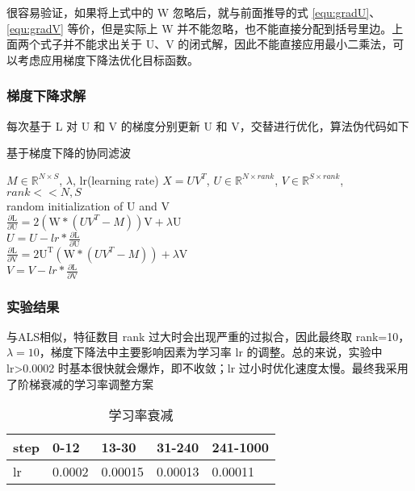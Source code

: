 \documentclass[UTF8,12pt]{ctexart}
\begin{document}
很容易验证，如果将上式中的 W 忽略后，就与前面推导的式 \ref{equ:gradU}、\ref{equ:gradV} 等价，但是实际上 W 并不能忽略，也不能直接分配到括号里边。上面两个式子并不能求出关于 U、V 的闭式解，因此不能直接应用最小二乘法，可以考虑应用梯度下降法优化目标函数。

\subsubsection{梯度下降求解}
每次基于 L 对 U 和 V 的梯度分别更新 U 和 V，交替进行优化，算法伪代码如下
\begin{algorithm}[htb]
\caption{基于梯度下降的协同滤波}
\label{alg:Gradient Descendent}
\begin{algorithmic}
	\Require
	$M \in \mathbb{R}^{N \times S}$, $\lambda$, lr(learning rate) 
	\Ensure
	$X = UV^T$, $U \in \mathbb{R}^{N \times rank}$, $V \in \mathbb{R}^{S \times rank}$, $rank << N, S$\\
		random initialization of U and V
		 \\
		\qquad $\frac{\partial \mathrm{L}}{\partial \mathrm{U}}=2\left(\mathrm{W} *\left(U V^{T}-M\right)\right) \mathrm{V}+\lambda \mathrm{U}$ \\
		\qquad $U = U - lr * \frac{\partial \mathrm{L}}{\partial \mathrm{U}}$ \\
		\qquad $\frac{\partial \mathrm{L}}{\partial \mathrm{V}}=2 \mathrm{U}^{\mathrm{T}}\left(\mathrm{W} *\left(U V^{T}-M\right)\right)+\lambda \mathrm{V}$ \\
		\qquad $V = V - lr * \frac{\partial \mathrm{L}}{\partial \mathrm{V}}$
		\EndFor
\end{algorithmic}
\end{algorithm}

\subsubsection{实验结果}

与ALS相似，特征数目 rank 过大时会出现严重的过拟合，因此最终取 rank=10，$\lambda=10$，梯度下降法中主要影响因素为学习率 lr 的调整。总的来说，实验中 lr>0.0002 时基本很快就会爆炸，即不收敛；lr 过小时优化速度太慢。最终我采用了阶梯衰减的学习率调整方案

\begin{table}[!htbp]
\centering
\begin{tabular}{|l|l|l|l|l|}
\hline
step & 0-12 & 13-30 & 31-240 & 241-1000 \\ \hline
lr & 0.0002 & 0.00015 & 0.00013 & 0.00011 \\ \hline
\end{tabular}
\caption{学习率衰减}
\end{table}
\end{document}
